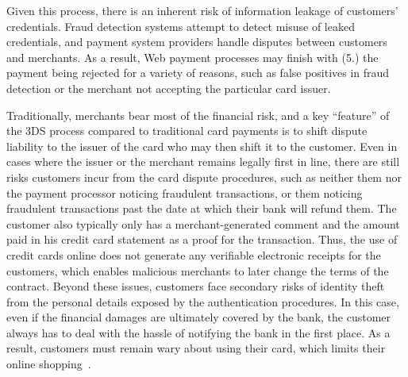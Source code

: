 \documentclass{llncs}
\begin{document}
Given this process, there is an inherent risk of information leakage
of customers' credentials.  Fraud detection systems attempt to detect
misuse of leaked credentials, and payment system providers handle
disputes between customers and merchants.  As a result, Web payment
processes may finish with {(5.)} the payment being rejected for a
variety of reasons, such as false positives in fraud detection or
the merchant not accepting the particular card issuer.

Traditionally, merchants bear most of the financial risk, and a key
``feature'' of the 3DS process compared to traditional card payments
is to shift dispute liability to the issuer of the card who
may then shift it to the customer.
%
%
Even in cases where the issuer or the merchant remains legally first in
line, there are still risks customers incur from the card dispute
procedures, such as neither them nor the payment processor noticing
fraudulent transactions, or them noticing fraudulent transactions past
the date at which their bank will refund them.  The customer also
typically only has a merchant-generated comment and the amount paid in
his credit card statement as a proof for the transaction.  Thus, the use of
credit cards online does not generate any verifiable electronic
receipts for the customers, which enables malicious merchants to later
change the terms of the contract.  Beyond these issues, customers face
secondary risks of identity theft from the personal details exposed by
the authentication procedures. In this case, even if the financial
damages are ultimately covered by the bank, the customer always has to
deal with the hassle of notifying the bank in the first place.  As a
result, customers must remain wary about using their card, which limits
their online shopping~\cite[p. 50]{ibi2014}.
%

\end{document}
